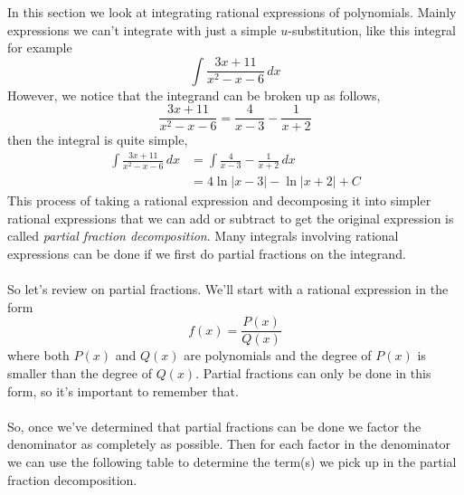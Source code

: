 \documentclass[10pt,reqno]{book}
\theoremstyle{definition}
\begin{document}
	In this section we look at integrating rational expressions of polynomials. Mainly expressions we can't integrate with just a simple $ u $-substitution, like this integral for example
	\[ \int \frac{3x + 11}{x^2 - x -6}\,dx \]
	However, we notice that the integrand can be broken up as follows,
	\[ \frac{3x + 11}{x^2 - x - 6} = \frac{4}{x - 3} - \frac{1}{x + 2} \]
	then the integral is quite simple,
	\begin{align*}
		\int \frac{3x + 11}{x^2 - x -6}\,dx &= \int \frac{4}{x - 3} - \frac{1}{x + 2}\,dx\\
		&= 4\ln|x-3| - \ln|x+2| + C
	\end{align*}	
	This process of taking a rational expression and decomposing it into simpler rational expressions that we can add or subtract to get the original expression is called \textit{partial fraction decomposition}. Many integrals involving rational expressions can be done if we first do partial fractions on the integrand.\\ \\
	So let's review on partial fractions. We'll start with a rational expression in the form
	\[ f(x) = \frac{P(x)}{Q(x)} \]
	where both $ P(x) $ and $ Q(x) $ are polynomials and the degree of $ P(x) $ is smaller than the degree of $ Q(x) $. Partial fractions can only be done in this form, so it's important to remember that.\\ \\
	So, once we've determined that partial fractions can be done we factor the denominator as completely as possible. Then for each factor in the denominator we can use the following table to determine the term(s) we pick up in the partial fraction decomposition.
	
\end{document}
